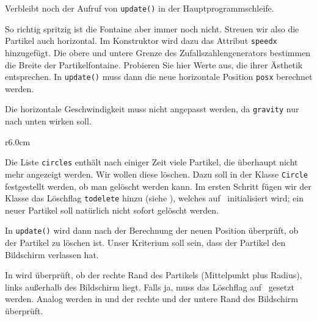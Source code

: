 
Verbleibt noch der Aufruf von \texttt{update()} in der Hauptprogrammschleife.


So richtig spritzig ist die Fontaine aber immer noch nicht. Streuen wir also die Partikel auch horizontal. Im Konstruktor wird dazu das Attribut \texttt{speedx} hinzugefügt. Die obere und untere Grenze des Zufallszahlengenerators bestimmen die Breite der Partikelfontaine. Probieren Sie hier Werte aus, die ihrer Ästhetik entsprechen. In \texttt{update()} muss dann die neue horizontale Position \texttt{posx} berechnet werden. 

Die horizontale Geschwindigkeit muss nicht angepasst werden, da \texttt{gravity} nur nach unten wirken soll.


\begin{wrapfigure}[17]{r}{6.0cm}%
	\begin{center}%
		\vspace{-1cm}%
	\end{center}%
\end{wrapfigure}%
Die Liste \texttt{circles} enthält nach einiger Zeit viele Partikel, die überhaupt nicht mehr angezeigt werden. Wir wollen diese löschen. Dazu soll in der Klasse \texttt{Circle} festgestellt werden, ob man gelöscht werden kann. Im ersten Schritt fügen wir der Klasse das Löschflag \texttt{todelete} hinzu (siehe ), welches auf \false\ initialisiert wird; ein neuer Partikel soll natürlich nicht sofort gelöscht werden.

In \texttt{update()} wird dann nach der Berechnung der neuen Position überprüft, ob der Partikel zu löschen ist. Unser Kriterium soll sein, dass der Partikel den Bildschirm verlassen hat.

In  wird überprüft, ob der rechte Rand des Partikels (Mittelpunkt plus Radius), links außerhalb des Bildschirm liegt. Falls ja, muss das Löschflag auf \true\ gesetzt werden. Analog werden in  und  der rechte und der untere Rand des Bildschirm überprüft. 

